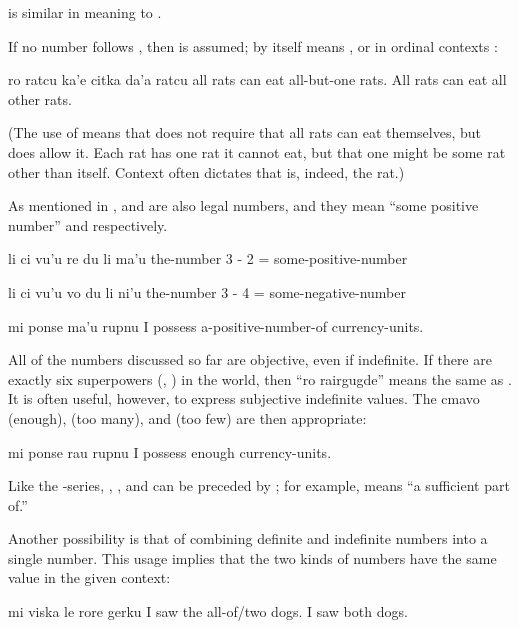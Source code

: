  is similar in meaning to . 

If no number follows , then  is assumed;
     by itself means , or in ordinal
    contexts :
\begin{example}
ro ratcu ka'e citka da'a ratcu\n
all rats can eat all-but-one rats.\n
All rats can eat all other rats.
\end{example}

(The use of  means that  does not require that all rats can eat themselves, but
    does allow it. Each rat has one rat it cannot eat, but that one
    might be some rat other than itself. Context often dictates
    that  is, indeed, the  rat.) 

As mentioned in ,  and
     are also legal numbers, and they mean ``some positive
    number'' and  respectively.
\begin{example}
li ci vu'u re du li ma'u\n
the-number 3 - 2 = some-positive-number
\end{example}

\begin{example}
li ci vu'u vo du li ni'u\n
the-number 3 - 4 = some-negative-number
\end{example}

\begin{example}
mi ponse ma'u rupnu\n
I possess a-positive-number-of currency-units.
\end{example}

All of the numbers discussed so far are objective, even if
    indefinite. If there are exactly six superpowers
    (, ) in the world, then ``ro
    rairgugde'' means the same as . It is often
    useful, however, to express subjective indefinite values. The
    cmavo  (enough),  (too many), and  (too
    few) are then appropriate:
\begin{example}
mi ponse rau rupnu\n
I possess enough currency-units.
\end{example}

Like the -series, , , and  can
    be preceded by ; for example,  means ``a
    sufficient part of.'' 

Another possibility is that of combining definite and
    indefinite numbers into a single number. This usage implies
    that the two kinds of numbers have the same value in the given
    context:
\begin{example}
mi viska le rore gerku\n
I saw the all-of/two dogs.\n
I saw both dogs.
\end{example}

